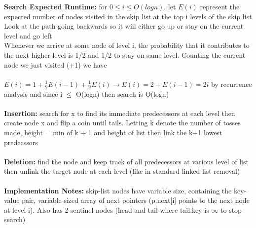 \documentclass{article}
\begin{document}
  \textbf{Search Expected Runtime: }for $0 \leq i \leq O(logn)$, let $E(i)$ represent the expected number of nodes visited in the skip list at the top i levels of the skip list\\
  Look at the path going backwards so it will either go up or stay on the current level and go left \\
  Whenever we arrive at some node of level i, the probability that it contributes to the next higher level is 1/2 and 1/2 to stay on same level. Counting the current node we just visited (+1) we have\\ \\
  $E(i) = 1 + \frac{1}{2}E(i-1) + \frac{1}{2}E(i) \rightarrow E(i) = 2 + E(i-1) = 2i$ by recurrence analysis and since i $\leq$ O(logn) then search is O(logn)\\ \\
  \textbf{Insertion: }search for x to find its immediate predecessors at each level then create node x and flip a coin until tails. Letting k denote the number of tosses made, height = min of k + 1 and height of list then link the k+1 lowest predecssors \\ \\
  \textbf{Deletion: }find the node and keep track of all predecessors at various level of list then unlink the target node at each level (like in standard linked list removal) \\ \\
  \textbf{Implementation Notes: }skip-list nodes have variable size, containing the key-value pair, variable-sized array of next pointers (p.next[i] points to the next node at level i). Also has 2 sentinel nodes (head and tail where tail.key is $\infty$ to stop search)\\
  \newpage
\end{document}
